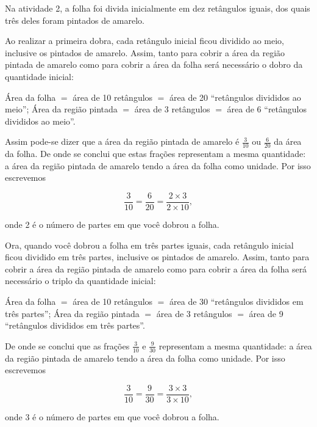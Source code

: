 \begin{refletindo*}

Na atividade 2, a folha foi divida inicialmente em dez retângulos iguais, dos quais três deles foram pintados de amarelo.

Ao realizar a primeira dobra, cada retângulo inicial ficou dividido ao meio, inclusive os pintados de amarelo. Assim, tanto para cobrir a área da região pintada de amarelo como para cobrir a área da folha será necessário o dobro da quantidade inicial:

Área da folha $=$ área de 10 retângulos $=$ área de 20 ``retângulos divididos ao meio'';\mbox{} \newline
Área da região pintada $=$ área de 3 retângulos $=$ área de 6 ``retângulos divididos ao meio''.

Assim pode-se dizer que a área da região pintada de amarelo é $\frac{3}{10}$ ou  $\frac{6}{20}$ da área da folha. De onde se conclui que estas frações representam a mesma quantidade: a área da região pintada de amarelo tendo a área da folha como unidade. Por isso escrevemos

$$\dfrac{3}{10} = \dfrac{6}{20} = \dfrac{2 \times 3}{2 \times 10},$$

onde 2 é o número de partes em que você dobrou a folha.

Ora, quando você dobrou a folha em três partes iguais, cada retângulo inicial ficou dividido em três partes, inclusive os pintados de amarelo. Assim, tanto para cobrir a área da região pintada de amarelo como para cobrir a área da folha será necessário o triplo da quantidade inicial:

Área da folha $=$ área de 10 retângulos $=$ área de 30 ``retângulos divididos em três partes'';\mbox{} \newline
Área da região pintada $=$ área de 3 retângulos $=$ área de 9 ``retângulos divididos em três partes''.

De onde se conclui que as frações $\frac{3}{10}$ e $\frac{9}{30}$ representam a mesma quantidade: a área da região pintada de amarelo tendo a área da folha como unidade. Por isso escrevemos

$$\dfrac{3}{10} = \dfrac{9}{30} = \dfrac{3 \times 3}{3 \times 10},$$

onde 3 é o número de partes em que você dobrou a folha.


\end{refletindo*}

